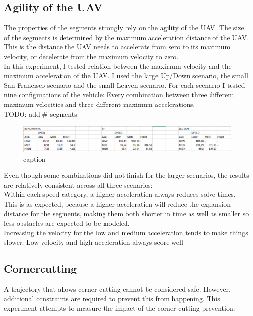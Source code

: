 \subsection{Agility of the UAV}
The properties of the segments strongly rely on the agility of the UAV. The size of the segments is determined by the maximum acceleration distance of the UAV. This is the distance the UAV needs to accelerate from zero to its maximum velocity, or decelerate from the maximum velocity to zero. \\
In this experiment, I tested relation between the maximum velocity and the maximum acceleration of the UAV. I used the large Up/Down scenario, the small San Francisco scenario and the small Leuven scenario. For each scenario I tested nine configurations of the vehicle: Every combination between three different maximum velocities and three different maximum accelerations.\\
TODO: add \# segments

\begin{figure}
\includegraphics[width=\textwidth]{img/agility1}
caption{}
\label{fig:agility-times}
\end{figure}
Even though some combinations did not finish for the larger scenarios, the results are relatively consistent across all three scenarios:\\
Within each speed category, a higher acceleration always reduces solve times. This is as expected, because a higher acceleration will reduce the expansion distance for the segments, making them both shorter in time as well as smaller so less obstacles are expected to be modeled.\\
Increasing the velocity for the low and medium acceleration tends to make things slower.
Low velocity and high acceleration always score well







\subsection{Cornercutting}
A trajectory that allows corner cutting cannot be considered safe. However, additional constraints are required to prevent this from happening. This experiment attempts to measure the impact of the corner cutting prevention.


